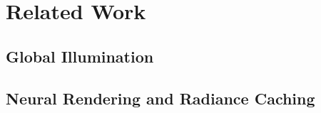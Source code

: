 
\chapter{Related Work}
\label{chap:related}

\section{Global Illumination}

\section{Neural Rendering and Radiance Caching}